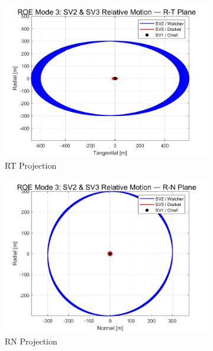 \begin{figure}[H]
    \centering
    \begin{subfigure}[b]{0.32\linewidth}
        \includegraphics[width=\linewidth]{sim/figures/PS5/mode_3_RTN.png_RT.png}
        \caption{RT Projection}
        \label{fig:mode_3_rt}
    \end{subfigure}
    \begin{subfigure}[b]{0.32\linewidth}
        \includegraphics[width=\linewidth]{sim/figures/PS5/mode_3_RTN.png_RN.png}
        \caption{RN Projection}
        \label{fig:mode_3_rn}
    \end{subfigure}
    \begin{subfigure}[b]{0.32\linewidth}

\end{subfigure}
\end{figure}
